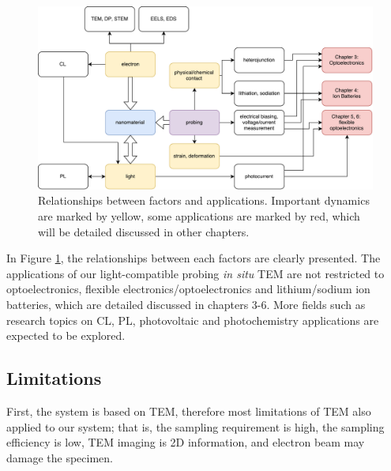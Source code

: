 \begin{figure}  
\includegraphics[width=400pt]{figures/figure2_apply}
\caption[Relationships between factors and applications.]{Relationships between factors and applications. Important dynamics are marked by yellow, some applications are marked by red, which will be detailed discussed in other chapters.
\label{fig:2_apply}}
\end{figure}

In Figure \ref{fig:2_apply}, the relationships between each factors are clearly presented. The applications of our light-compatible probing {\em in situ} TEM are not restricted to optoelectronics, flexible electronics/optoelectronics and lithium/sodium ion batteries, which are detailed discussed in chapters 3-6. More fields such as research topics on CL, PL, photovoltaic and photochemistry applications are expected to be explored. 


\subsection{Limitations}
First, the system is based on TEM, therefore most limitations of TEM also applied to our system; that is, the sampling requirement is high, the sampling efficiency is low, TEM imaging is 2D information, and electron beam may damage the specimen. 

